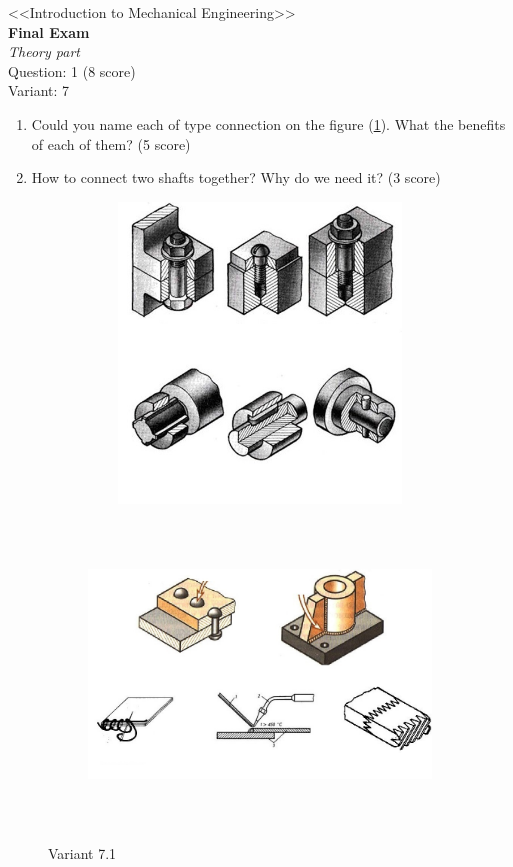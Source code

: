 \documentclass[12pt]{article}
\newcommand\pic[1]{(\cref{#1})} %
\newcommand\ttask[2]{
        \begin{center}
            \LARGE <<Introduction to Mechanical Engineering>> \\ \textbf{Final Exam} \\ \textit{Theory part} \\
            Question: 1 (8 score) \\ Variant: #1
        \end{center}
    #2
    \newpage
    }
\begin{document}
\ttask{7}{
    \begin{enumerate}
        \item Could you name each of type connection on the figure \pic{fig:resources_THEORY/final_connections.png}. What the benefits of each of them? (5 score)
        \item How to connect two shafts together? Why do we need it? (3 score)
    \end{enumerate}

    \begin{figure}[H]
        \begin{subfigure}{0.99\textwidth}
            \centering\includegraphics[height=8cm,width=1\textwidth,keepaspectratio]{detach.jpg}
        \end{subfigure}

        \begin{subfigure}{0.99\textwidth}
            \centering\includegraphics[height=8cm,width=1\textwidth,keepaspectratio]{fixed.jpg}
        \end{subfigure}

    \caption{Variant 7.1}
    \label{fig:resources_THEORY/final_connections.png}
\end{figure}
}
\end{document}
